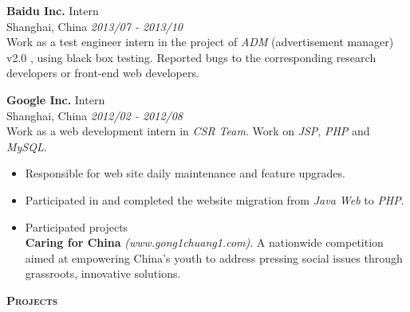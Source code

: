 \documentclass[a4paper]{article}
\newenvironment{changemargin}[2]{%
  \begin{list}{}{%
    \setlength{\topsep}{0pt}%
    \setlength{\leftmargin}{#1}%
    \setlength{\rightmargin}{#2}%
    \setlength{\listparindent}{\parindent}%
    \setlength{\itemindent}{\parindent}%
    \setlength{\parsep}{\parskip}%
  }%
  \item[]}{\end{list}
}
\newcommand{\lineover}{
	\begin{changemargin}{-0.05in}{-0.05in}
		\vspace*{-8pt}
		\hrulefill \\
		\vspace*{-2pt}
	\end{changemargin}
}
\newcommand{\header}[1]{
	\begin{changemargin}{-0.5in}{-0.5in}
		\scshape{\textbf{#1}}\\
	\end{changemargin}
}
\newenvironment{body} {
	\vspace*{-16pt}
	\begin{changemargin}{-0.25in}{-0.5in}
  }	
	{\end{changemargin}
}
\begin{document}
\begin{body}
	\vspace{14pt}
	\textbf{Baidu Inc.} \hfill Intern\\ 
	Shanghai, China \hfill \emph{2013/07 - 2013/10}\\ 
	Work as a test engineer intern in the project of \emph{ADM} (advertisement manager) v2.0  , using black box testing. Reported bugs to the corresponding research developers or front-end web developers.\\
	\smallskip
	
	\textbf{Google Inc.} \hfill Intern\\ 
	Shanghai, China \hfill \emph{2012/02 - 2012/08}\\ 
	Work as a web development intern in \emph{CSR Team}. Work on \emph{JSP}, \emph{PHP} and \emph{MySQL}.
	\vspace*{-6pt}
	\begin{itemize} \itemsep -0pt  %
		\item Responsible for web site daily maintenance and feature upgrades.\\
	\end{itemize}
	\vspace*{-10pt}
	\begin{itemize} \itemsep -0pt  %
		\item Participated in and completed the website migration from \emph{Java Web} to \emph{PHP}.\\
	\end{itemize}
	\vspace*{-12pt}
	\begin{itemize} \itemsep -0pt  %
		\item Participated projects\\
		\textbf{Caring for China} \emph{(www.gong1chuang1.com)}. A nationwide competition aimed at empowering China's youth to address pressing social issues through grassroots, innovative solutions.\\
	\end{itemize}
\end{body}

\medskip

\header{Projects}
\end{document}
